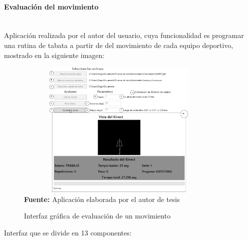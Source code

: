 \paragraph{Evaluaci\'on del movimiento}\mbox{} \\
Aplicaci\'on realizada por el autor del usuario, cuya funcionalidad es programar una rutina de tabata a partir de del movimiento de cada equipo deportivo, mostrado en la siguiente imagen:
\begin{figure}[H]
	\caption{Interfaz gr\'afica de evaluaci\'on de un movimiento}
	\label{fig:appEvaluate}
	\centering
	\includegraphics[width=380px,height=250px]{graphics/appEvaluacion.png} \\
	\textbf{Fuente:} Aplicaci\'on elaborada por el autor de tesis
\end{figure}
Interfaz que se divide en 13 componentes:
